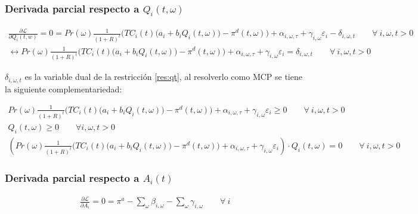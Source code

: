 \subsubsection{Derivada parcial respecto a $Q_i(t,\omega)$}
\begin{footnotesize}
\begin{align}
   \frac{\partial \mathcal{L} }{\partial Q_i(t,w)}= 
   0= Pr(\omega)  \frac{1}{(1+R)^t} \bigg( TC_i(t) \big(a_{i}+b_i Q_i(t,\omega)\big ) -\pi^d(t,\omega) \bigg) + \alpha_{i,\omega,\tau} + \gamma_{i,\omega} \varepsilon_{i} -\delta_{i,\omega,t} \qquad  \forall \ i, \omega, t > 0\\
   \leftrightarrow Pr(\omega)  \frac{1}{(1+R)^t} \bigg( TC_i(t) \big(a_{i}+b_i Q_i(t,\omega)\big ) -\pi^d(t,\omega) \bigg) + \alpha_{i,\omega,\tau} + \gamma_{i,\omega} \varepsilon_{i}= \delta_{i,\omega,t} \qquad \forall \ i, \omega, t > 0
\end{align}
\end{footnotesize}

$\delta_{i,\omega,t}$ es la variable dual de la restricción \ref{res:qt}, al resolverlo como MCP se tiene la siguiente complementariedad:

\begin{footnotesize}
\begin{align}
    Pr(\omega)  \frac{1}{(1+R)^t} \bigg( TC_i(t) \big(a_{i}+b_i Q_i(t,\omega)\big ) -\pi^d(t,\omega) \bigg) + \alpha_{i,\omega,\tau} + \gamma_{i,\omega} \varepsilon_{i} \geq 0 \qquad \forall \ i, \omega, t > 0\\
    Q_i(t,\omega) \geq 0 \qquad  \forall i, \omega, t > 0\\
    (Pr(\omega)  \frac{1}{(1+R)^t} \bigg( TC_i(t) \big(a_{i}+b_i Q_i(t,\omega)\big ) -\pi^d(t,\omega) \bigg) + \alpha_{i,\omega,\tau} + \gamma_{i,\omega} \varepsilon_{i})\cdot  Q_i(t,\omega)= 0 \qquad \forall \ i, \omega, t > 0
\end{align}

\end{footnotesize}


\subsubsection{Derivada parcial respecto a $A_i(t)$}
\begin{footnotesize}
\begin{align}
   \frac{\partial \mathcal{L} }{\partial A_i}= 0
   = \pi^{a} - \sum_{\omega}\beta_{i,\omega} - \sum_{\omega}\gamma_{i,\omega}  \qquad \forall \  i \\
\end{align}

\end{footnotesize}


